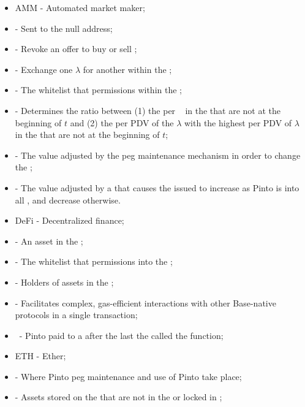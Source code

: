 \documentclass[class=article, crop=false]{standalone}
\begin{document}
\begin{itemize}[topsep=0pt, itemsep=3pt,leftmargin=16pt]
    \item[] AMM - Automated market maker;
    \item[]  - Sent to the null address;
    \item[]  - Revoke an offer to buy or sell ;
    \item[]  - Exchange one  $\lambda$ for another within the ;
    \item[]  - The whitelist that permissions  within the ;
    \item[]  - Determines the ratio between (1) the  per \Pinto\  in the  that are not  at the beginning of $t$ and (2) the  per PDV of the $\lambda$ with the highest  per PDV of $\lambda$  in the  that are not  at the beginning of $t$;
    \item[]  - The value adjusted by the peg maintenance mechanism in order to change the ;
    \item[]  - The value adjusted by a  that causes the  issued to increase as Pinto is  into all , and decrease otherwise. 
    \item[] DeFi - Decentralized finance;
    \item[]  - An asset in the ;
    \item[]  - The whitelist that permissions  into the ;
    \item[]  - Holders of  assets in the ;
    \item[]  - Facilitates complex, gas-efficient interactions with other Base-native protocols in a single transaction;
    \item[]  \Pinto\ - Pinto paid to a  after the last  the  called the  function;
    \item[] ETH - Ether;
    \item[]  - Where Pinto peg maintenance and use of Pinto take place;
    \item[]  - Assets stored on the  that are not  in the  or locked in ;

\end{itemize}
\end{document}
